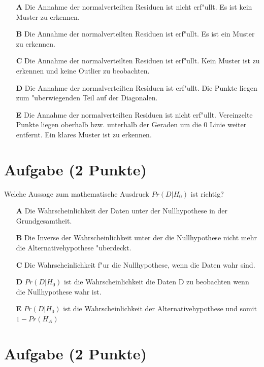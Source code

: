 \documentclass[a4paper, 10pt]{scrartcl}\usepackage[]{graphicx}\usepackage[]{xcolor}
\begin{document}
\begin{enumerate}
\item [\textbf{A} \msquare] Die Annahme der normalverteilten Residuen ist nicht erf{"u}llt. Es ist kein Muster zu erkennen.
\item [\textbf{B} \msquare] Die Annahme der normalverteilten Residuen ist erf{"u}llt. Es ist ein Muster zu erkennen.
\item [\textbf{C} \msquare] Die Annahme der normalverteilten Residuen ist erf{"u}llt. Kein Muster ist zu erkennen und keine Outlier zu beobachten.
\item [\textbf{D} \msquare] Die Annahme der normalverteilten Residuen ist erf{"u}llt. Die Punkte liegen zum {"u}berwiegenden Teil auf der Diagonalen.
\item [\textbf{E} \msquare] Die Annahme der normalverteilten Residuen ist nicht erf{"u}llt. Vereinzelte Punkte liegen oberhalb bzw. unterhalb der Geraden um die 0 Linie weiter entfernt. Ein klares Muster ist zu erkennen.
\end{enumerate}

\section{Aufgabe \hfill (2 Punkte)}

Welche Aussage zum mathematische Ausdruck $Pr(D|H_0)$ ist richtig? 



\begin{enumerate}
\item [\textbf{A} \msquare] Die Wahrscheinlichkeit der Daten unter der Nullhypothese in der Grundgesamtheit.
\item [\textbf{B} \msquare] Die Inverse der Wahrscheinlichkeit unter der die Nullhypothese nicht mehr die Alternativehypothese {"u}berdeckt.
\item [\textbf{C} \msquare] Die Wahrscheinlichkeit f{"u}r die Nullhypothese, wenn die Daten wahr sind.
\item [\textbf{D} \msquare] $Pr(D|H_0)$ ist die Wahrscheinlichkeit die Daten D zu beobachten wenn die Nullhypothese wahr ist.
\item [\textbf{E} \msquare] $Pr(D|H_0)$ ist die Wahrscheinlichkeit der Alternativehypothese und somit $1 - Pr(H_A)$
\end{enumerate}

\section{Aufgabe \hfill (2 Punkte)}
\end{document}
